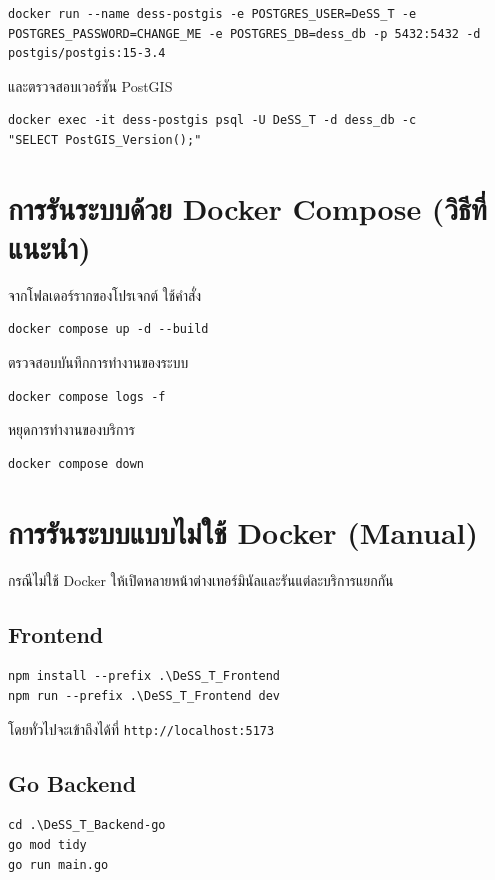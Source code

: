 \begin{verbatim}
docker run --name dess-postgis -e POSTGRES_USER=DeSS_T -e 
POSTGRES_PASSWORD=CHANGE_ME -e POSTGRES_DB=dess_db -p 5432:5432 -d 
postgis/postgis:15-3.4
\end{verbatim}

และตรวจสอบเวอร์ชัน PostGIS
\begin{verbatim}
docker exec -it dess-postgis psql -U DeSS_T -d dess_db -c 
"SELECT PostGIS_Version();"
\end{verbatim}

\section{การรันระบบด้วย Docker Compose (วิธีที่แนะนำ)}
\begin{mypara}
    \indent จากโฟลเดอร์รากของโปรเจกต์ ใช้คำสั่ง
\end{mypara}

\begin{verbatim}
docker compose up -d --build
\end{verbatim}

ตรวจสอบบันทึกการทำงานของระบบ
\begin{verbatim}
docker compose logs -f
\end{verbatim}

หยุดการทำงานของบริการ
\begin{verbatim}
docker compose down
\end{verbatim}

\section{การรันระบบแบบไม่ใช้ Docker (Manual)}
\begin{mypara}
    \indent กรณีไม่ใช้ Docker ให้เปิดหลายหน้าต่างเทอร์มินัลและรันแต่ละบริการแยกกัน
\end{mypara}

\subsection{Frontend}
\begin{verbatim}
npm install --prefix .\DeSS_T_Frontend
npm run --prefix .\DeSS_T_Frontend dev
\end{verbatim}
โดยทั่วไปจะเข้าถึงได้ที่ \texttt{http://localhost:5173}

\subsection{Go Backend}
\begin{verbatim}
cd .\DeSS_T_Backend-go
go mod tidy
go run main.go
\end{verbatim}

